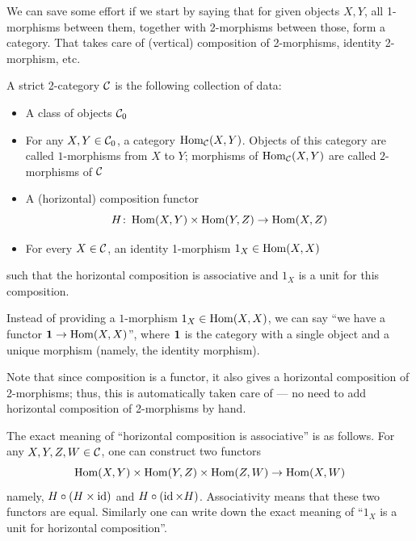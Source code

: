 We can save some effort if we start by saying that for given objects
$X,Y$, all 1-morphisms between them, together with 2-morphisms between those,
form a category. That takes care of (vertical) composition of 2-morphisms,
identity 2-morphism, etc.

\begin{definition}\label{d:2-cat-strict}
  A strict 2-category $\mathcal{C}$ is the following collection of data:
  \begin{itemize}
    \item A class of objects $\mathcal{C}_0$
    \item For any $X, Y\in \mathcal{C}_0$, a category $\operatorname{Hom}_{\mathcal{C}}(X,Y)$. Objects of
      this category are called $1$-morphisms from $X$ to $Y$; morphisms
      of $\operatorname{Hom}_{\mathcal{C}}(X,Y)$ are called $2$-morphisms of $\mathcal{C}$
    \item A (horizontal) composition functor
      $$
        H\colon \operatorname{Hom}(X,Y)\times \operatorname{Hom}(Y,Z)\to \operatorname{Hom}(X,Z)
      $$
    \item For every $X\in \mathcal{C}$, an identity 1-morphism $1_X\in \operatorname{Hom}(X,X)$
  \end{itemize}
  such that the horizontal composition is associative and $1_X$ is a unit
  for this composition.
\end{definition}
Instead of providing a $1$-morphism $1_X\in \operatorname{Hom}(X,X)$, we can say
``we have a functor $\mathbf{1}\to\operatorname{Hom}(X,X)$'', where $\mathbf{1}$ is the category
with a single object and a unique morphism (namely, the identity morphism).

Note that since composition is a functor, it also gives a horizontal
composition of 2-morphisms; thus, this is automatically taken care of --- no
need to add horizontal composition of 2-morphisms by hand.

The exact meaning of ``horizontal composition is associative'' is as follows.
For any $X,Y,Z,W\in \mathcal{C}$, one can construct two functors
$$
\operatorname{Hom}(X,Y)\times \operatorname{Hom}(Y,Z)\times\operatorname{Hom}(Z,W)\to \operatorname{Hom}(X,W)
$$
namely, $H\circ (H\times \operatorname{id})$ and $H\circ (\operatorname{id} \times H)$. Associativity
means that these two functors are equal. Similarly one can write down the exact
meaning of ``$1_X$ is a unit for horizontal composition''.

